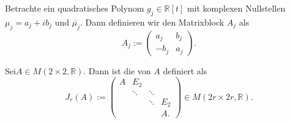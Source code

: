 \documentclass[8pt, a4paper, twocolumn, landscape]{article}
\begin{document}
\begin{definition}
Betrachte ein quadratisches Polynom $g_j \in \mathbb{R}[t]$ mit komplexen Nullstellen $\mu_j = a_j + i b_j$ und $\overline{\mu_j}$. Dann definieren wir den Matrixblock $A_j$ als
$$
A_j := \left( \begin{array}{cc}
a_j & b_j \\ -b_j & a_j
\end{array} \right).
$$

Sei$A \in M( 2 \times 2, \mathbb{R})$. Dann ist die  von $A$ definiert als
$$
J_r(A) := \left( \begin{array}{cccc}
A & E_2 & & \\ & \ddots & \ddots & \\ & & \ddots & E_2 \\ & & & A.
\end{array} \right) \in M( 2r \times 2r, \mathbb{R}).
$$

\end{definition}
\end{document}
